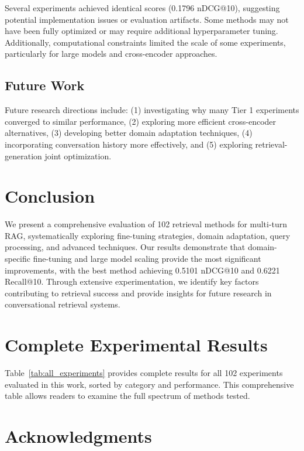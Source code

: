 \documentclass[11pt]{article}
\begin{document}
Several experiments achieved identical scores (0.1796 nDCG@10), suggesting potential implementation issues or evaluation artifacts. Some methods may not have been fully optimized or may require additional hyperparameter tuning. Additionally, computational constraints limited the scale of some experiments, particularly for large models and cross-encoder approaches.

\subsection{Future Work}

Future research directions include: (1) investigating why many Tier 1 experiments converged to similar performance, (2) exploring more efficient cross-encoder alternatives, (3) developing better domain adaptation techniques, (4) incorporating conversation history more effectively, and (5) exploring retrieval-generation joint optimization.

\section{Conclusion}

We present a comprehensive evaluation of 102 retrieval methods for multi-turn RAG, systematically exploring fine-tuning strategies, domain adaptation, query processing, and advanced techniques. Our results demonstrate that domain-specific fine-tuning and large model scaling provide the most significant improvements, with the best method achieving 0.5101 nDCG@10 and 0.6221 Recall@10. Through extensive experimentation, we identify key factors contributing to retrieval success and provide insights for future research in conversational retrieval systems.

\appendix
\section{Complete Experimental Results}

Table~\ref{tab:all_experiments} provides complete results for all 102 experiments evaluated in this work, sorted by category and performance. This comprehensive table allows readers to examine the full spectrum of methods tested.



\section*{Acknowledgments}
\end{document}
